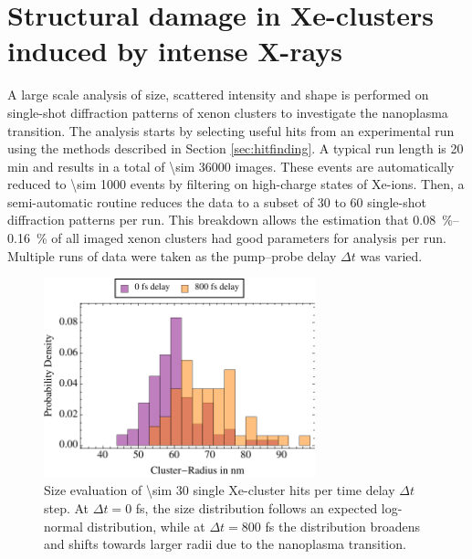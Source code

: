 \section{Structural damage in Xe-clusters induced by intense X-rays}\label{sec:xenon-data}
A large scale analysis of size, scattered intensity and shape is performed on single-shot diffraction patterns of xenon clusters to investigate the nanoplasma transition. The analysis starts by selecting useful hits from an experimental run using the methods described in Section \ref{sec:hitfinding}. A typical run length is 20 min and results in a total of \num{\sim 36000} images. These events are automatically reduced to \num{\sim 1000} events by filtering on high-charge states of Xe-ions. Then, a semi-automatic routine reduces the data to a subset of 30 to 60 single-shot diffraction patterns per run. This breakdown allows the estimation that \SIrange{0.08}{0.16}{\percent} of all imaged xenon clusters had good parameters for analysis per run. Multiple runs of data were taken as the pump--probe delay $\Delta t$ was varied.\\[1\baselineskip]
\begin{figure}
	\centering
		\includegraphics[width=0.70\textwidth]{images/size-distributions.pdf}
	\caption[Single Xe-cluster size distribution at varying time delay $\Delta t$.]{Size evaluation of \num{\sim 30} single Xe-cluster hits per time delay $\Delta t$ step. At $\Delta t=0$ fs, the size distribution follows an expected log-normal distribution, while at $\Delta t=800$ fs the distribution broadens and shifts towards larger radii due to the nanoplasma transition.}
	\label{fig:size-distributions}
\end{figure}
